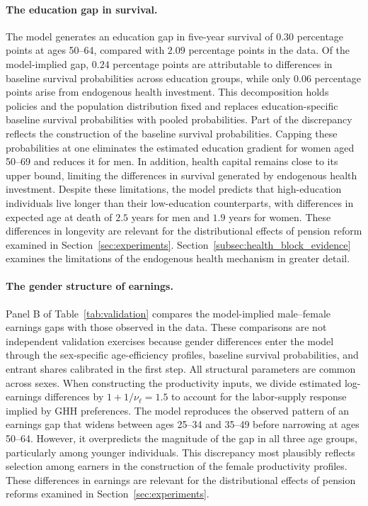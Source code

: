 \documentclass[12pt,a4paper]{article}
\begin{document}
\paragraph{The education gap in survival.}
The model generates an education gap in five-year survival of $0.30$ percentage points at ages 50--64, compared with $2.09$ percentage points in the data. Of the model-implied gap, $0.24$ percentage points are attributable to differences in baseline survival probabilities across education groups, while only $0.06$ percentage points arise from endogenous health investment. This decomposition holds policies and the population distribution fixed and replaces education-specific baseline survival probabilities with pooled probabilities. Part of the discrepancy reflects the construction of the baseline survival probabilities. Capping these probabilities at one eliminates the estimated education gradient for women aged 50--69 and reduces it for men. In addition, health capital remains close to its upper bound, limiting the differences in survival generated by endogenous health investment. Despite these limitations, the model predicts that high-education individuals live longer than their low-education counterparts, with differences in expected age at death of $2.5$ years for men and $1.9$ years for women. These differences in longevity are relevant for the distributional effects of pension reform examined in Section~\ref{sec:experiments}. Section~\ref{subsec:health_block_evidence} examines the limitations of the endogenous health mechanism in greater detail.

\paragraph{The gender structure of earnings.}
Panel B of Table~\ref{tab:validation} compares the model-implied male--female earnings gaps with those observed in the data. These comparisons are not independent validation exercises because gender differences enter the model through the sex-specific age-efficiency profiles, baseline survival probabilities, and entrant shares calibrated in the first step. All structural parameters are common across sexes. When constructing the productivity inputs, we divide estimated log-earnings differences by $1+1/\nu_\ell=1.5$ to account for the labor-supply response implied by GHH preferences. The model reproduces the observed pattern of an earnings gap that widens between ages 25--34 and 35--49 before narrowing at ages 50--64. However, it overpredicts the magnitude of the gap in all three age groups, particularly among younger individuals. This discrepancy most plausibly reflects selection among earners in the construction of the female productivity profiles. These differences in earnings are relevant for the distributional effects of pension reforms examined in Section~\ref{sec:experiments}.
\end{document}
